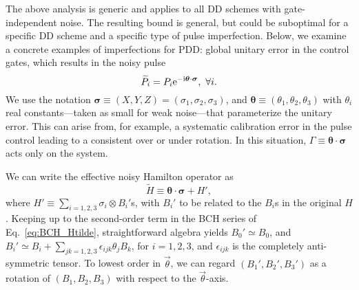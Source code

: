 \documentclass[b5paper,11pt]{article}
\begin{document}
The above analysis is generic and applies to all DD schemes with gate-independent noise. 
The resulting bound is general, but could be suboptimal for a specific DD scheme and a specific type of pulse imperfection. Below, we examine a concrete examples of imperfections  for PDD: 
global unitary error in the control gates,  which results in the noisy pulse 
\begin{equation}
\widetilde P_i=P_i\mathrm{e}^{-\mathrm{i} \bm{\theta}\cdot\bm\sigma},\ \forall i.
\end{equation}
We use the notation $\bm\sigma\equiv (X,Y,Z)=(\sigma_1,\sigma_2,\sigma_3)$, and $\bm\theta\equiv (\theta_1,\theta_2,\theta_3)$ with $\theta_i$ real constants---taken as small for weak noise---that parameterize the unitary error.  This can arise from, for example, a systematic calibration error in the pulse control leading to a consistent over or under rotation.  
 In this situation, $\Gamma\equiv \bm\theta\cdot\bm\sigma$ acts only on the system. 

We can write the effective noisy Hamilton operator as
\begin{equation}
\widetilde H\equiv \bm\theta\cdot\bm\sigma+H',
\end{equation}
where $H'\equiv \sum_{i=1,2,3}\sigma_i\otimes B_i'$s, with $B_i'$ to be related to the $B_i$s in the original $H$. Keeping up to the second-order term in the BCH series of Eq.~\eqref{eq:BCH_Htilde}, straightforward algebra yields $B_0'\simeq B_0$, and $B_i'\simeq B_i+\sum_{jk=1,2,3}\epsilon_{ijk}\theta_j B_k$, for $i=1,2,3$, and $\epsilon_{ijk}$ is the completely anti-symmetric tensor.
To lowest order in $\vec\theta$, we can regard $(B_1',B_2',B_3')$ as a rotation of $(B_1,B_2,B_3)$ with respect to the $\vec\theta$-axis. 
 
\end{document}
